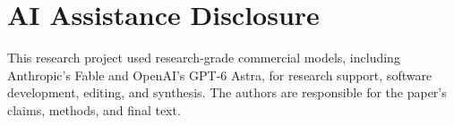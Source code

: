 \documentclass[11pt]{article}
\begin{document}
\section*{AI Assistance Disclosure}
This research project used research-grade commercial models, including
Anthropic's Fable and OpenAI's GPT-6 Astra, for research support, software
development, editing, and synthesis. The authors are responsible for the
paper's claims, methods, and final text.
\end{document}
